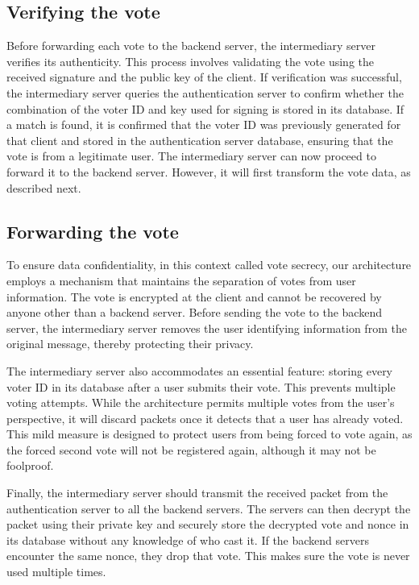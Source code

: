 \documentclass[a4paper,12pt,english]{article}
\begin{document}
\subsection{Verifying the vote}\label{sec:design-verifying}

Before forwarding each vote to the backend server, the intermediary server verifies its authenticity. This process involves validating the vote using the received signature and the public key of the client. If verification was successful, the intermediary server queries the authentication server to confirm whether the combination of the voter ID and key used for signing is stored in its database. If a match is found, it is confirmed that the voter ID was previously generated for that client and stored in the authentication server database, ensuring that the vote is from a legitimate user. The intermediary server can now proceed to forward it to the backend server. However, it will first transform the vote data, as described next.

\subsection{Forwarding the vote}\label{sec:design-forwarding}

To ensure data confidentiality, in this context called vote secrecy, our architecture employs a mechanism that maintains the separation of votes from user information. The vote is encrypted at the client and cannot be recovered by anyone other than a backend server. Before sending the vote to the backend server, the intermediary server removes the user identifying information from the original message, thereby protecting their privacy.

The intermediary server also accommodates an essential feature: storing every voter ID in its database after a user submits their vote. This prevents multiple voting attempts. While the architecture permits multiple votes from the user's perspective, it will discard packets once it detects that a user has already voted. This mild measure is designed to protect users from being forced to vote again, as the forced second vote will not be registered again, although it may not be foolproof.

Finally, the intermediary server should transmit the received packet from the authentication server to all the backend servers. The servers can then decrypt the packet using their private key and securely store the decrypted vote and nonce in its database without any knowledge of who cast it. If the backend servers encounter the same nonce, they drop that vote. This makes sure the vote is never used multiple times.
\end{document}
